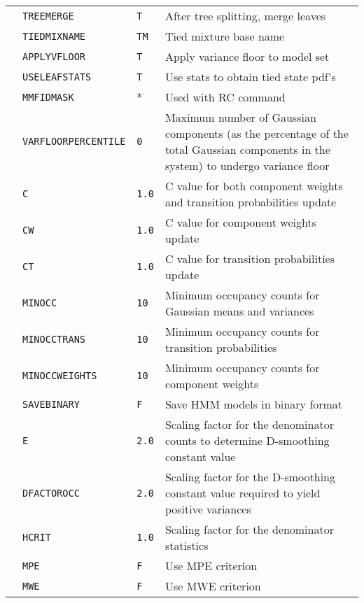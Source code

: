 \begin{center}
\begin{supertabular}{|p{1.8cm}|l|l|p{6.6cm}|}
 & \texttt{TREEMERGE} & \texttt{T} & After tree splitting, merge leaves \\ 
  & \texttt{TIEDMIXNAME} & \texttt{TM} & Tied mixture base name \\ 
  & \texttt{APPLYVFLOOR} & \texttt{T} & Apply variance floor to model set \\  
  & \texttt{USELEAFSTATS} & \texttt{T} & Use stats to obtain tied state pdf's \\ 
  & \texttt{MMFIDMASK} & * & Used with RC  command \\
 \hline

& \texttt{VARFLOORPERCENTILE} & \texttt{0} & Maximum number of Gaussian components (as the percentage of the total Gaussian components in the system) to undergo variance floor \\ 
& \texttt{C} & \texttt{1.0} & C value for both component weights and transition probabilities update \\ 
& \texttt{CW} & \texttt{1.0} & C value for component weights update\\ 
& \texttt{CT} & \texttt{1.0} & C value for transition probabilities update\\ 
& \texttt{MINOCC} & \texttt{10} & Minimum occupancy counts for Gaussian means and variances \\ 
& \texttt{MINOCCTRANS} & \texttt{10} & Minimum occupancy counts for transition probabilities \\ 
& \texttt{MINOCCWEIGHTS} & \texttt{10} & Minimum occupancy counts for component weights \\ 
& \texttt{SAVEBINARY} & \texttt{F} & Save HMM models in binary format \\ 
& \texttt{E} & \texttt{2.0} & Scaling factor for the denominator counts to determine D-smoothing constant value \\ 
& \texttt{DFACTOROCC} & \texttt{2.0} & Scaling factor for the D-smoothing constant value required to yield positive variances \\ 
& \texttt{HCRIT} & \texttt{1.0} & Scaling factor for the denominator statistics \\ 
& \texttt{MPE} & \texttt{F} & Use MPE criterion \\ 
& \texttt{MWE} & \texttt{F} & Use MWE criterion \\ 

\end{supertabular}
\end{center}
